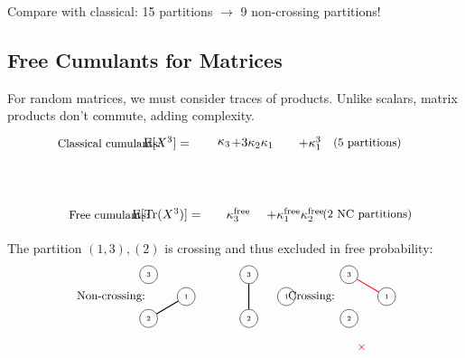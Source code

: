 Compare with classical: 15 partitions $\to$ 9 non-crossing partitions!

\subsection{Free Cumulants for Matrices}

For random matrices, we must consider traces of products. Unlike scalars, matrix products don't commute, adding complexity.
\[
\begin{tikzpicture}[baseline=-.5em, scale=0.8]
   \node at (-2,1) {\small Classical cumulants:};
   \node at (-2,-1.5) {\small Free cumulants:};
   
   \node at (0,1) {$\mathrm{E}[X^3] =$};
   \node at (2,1) {$\kappa_3$};
   \node at (3,1) {$+ 3\kappa_2\kappa_1$};
   \node at (5,1) {$+ \kappa_1^3$};
   \node at (7,1) {\small (5 partitions)};
   
   \node at (0,-1.5) {$\mathrm{E}[\mathrm{Tr}(X^3)] =$};
   \node at (2.5,-1.5) {$\kappa_3^{\text{free}}$};
   \node at (4.5,-1.5) {$+ \kappa_1^{\text{free}}\kappa_2^{\text{free}}$};
   \node at (7,-1.5) {\small (2 NC partitions)};
\end{tikzpicture}
\]

The partition $(1,3),(2)$ is crossing and thus excluded in free probability:
\[
\begin{tikzpicture}[baseline=0, scale=0.7]
   \node at (-2,0) {\small Non-crossing:};
   \foreach \i in {1,2,3} {
      \node[circle, draw] (A\i) at (120-120*\i:1) {\tiny \i};
   }
   \draw[thick] (A1) to (A2);
   \draw[thick] (A3) to (A3);
   
   \begin{scope}[xshift=4cm]
      \foreach \i in {1,2,3} {
         \node[circle, draw] (B\i) at (120-120*\i:1) {\tiny \i};
      }
      \draw[thick] (B1) to (B1);
      \draw[thick] (B2) to (B3);
   \end{scope}
   
   \begin{scope}[xshift=8cm]
      \node at (-2,0) {\small Crossing:};
      \foreach \i in {1,2,3} {
         \node[circle, draw] (C\i) at (120-120*\i:1) {\tiny \i};
      }
      \draw[thick, red] (C1) to (C3);
      \draw[thick] (C2) to (C2);
      \node[red] at (0,-2) {\small $\times$};
   \end{scope}
\end{tikzpicture}
\]


